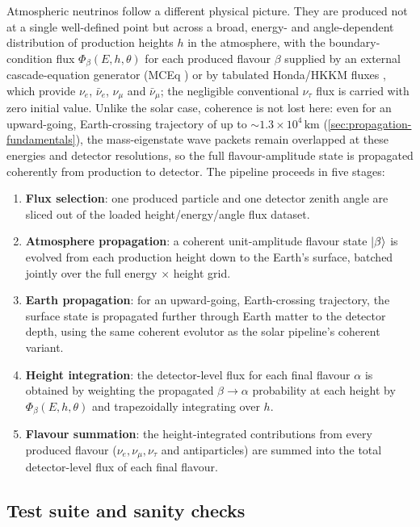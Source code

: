 Atmospheric neutrinos follow a different physical picture. They are produced not at a single well-defined point but across a broad, energy- and angle-dependent distribution of production heights \(h\) in the atmosphere, with the boundary-condition flux \(\Phi_\beta(E,h,\theta)\) for each produced flavour \(\beta\) supplied by an external cascade-equation generator (MCEq \parencite{Fedynitch2015}) or by tabulated Honda/HKKM fluxes \parencite{Honda2007}, which provide \(\nu_e\), \(\bar\nu_e\), \(\nu_\mu\) and \(\bar\nu_\mu\); the negligible conventional \(\nu_\tau\) flux is carried with zero initial value. Unlike the solar case, coherence is not lost here: even for an upward-going, Earth-crossing trajectory of up to \(\sim1.3\times10^4\,\mathrm{km}\) (\cref{sec:propagation-fundamentals}), the mass-eigenstate wave packets remain overlapped at these energies and detector resolutions, so the full flavour-amplitude state is propagated coherently from production to detector. The pipeline proceeds in five stages:

\begin{enumerate}
  \item \textbf{Flux selection}: one produced particle and one detector zenith angle are sliced out of the loaded height/energy/angle flux dataset.
  \item \textbf{Atmosphere propagation}: a coherent unit-amplitude flavour state \(\left|\beta\right\rangle\) is evolved from each production height down to the Earth's surface, batched jointly over the full energy \(\times\) height grid.
  \item \textbf{Earth propagation}: for an upward-going, Earth-crossing trajectory, the surface state is propagated further through Earth matter to the detector depth, using the same coherent evolutor as the solar pipeline's coherent variant.
  \item \textbf{Height integration}: the detector-level flux for each final flavour \(\alpha\) is obtained by weighting the propagated \(\beta\to\alpha\) probability at each height by \(\Phi_\beta(E,h,\theta)\) and trapezoidally integrating over \(h\).
  \item \textbf{Flavour summation}: the height-integrated contributions from every produced flavour (\(\nu_e,\nu_\mu,\nu_\tau\) and antiparticles) are summed into the total detector-level flux of each final flavour.
\end{enumerate}

\subsection{Test suite and sanity checks}

